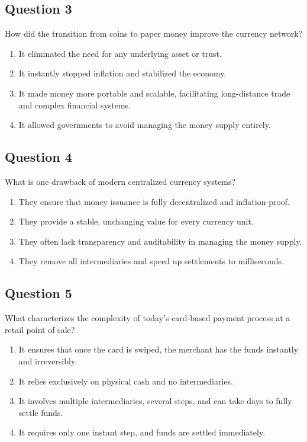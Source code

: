 \documentclass[12pt,a4paper]{article}
\begin{document}
\subsection*{Question 3}
How did the transition from coins to paper money improve the currency network?

\begin{enumerate}[label=\Alph*., leftmargin=*]
\item It eliminated the need for any underlying asset or trust.
\item It instantly stopped inflation and stabilized the economy.
\item It made money more portable and scalable, facilitating long-distance trade and complex financial systems.
\item It allowed governments to avoid managing the money supply entirely.
\end{enumerate}

\bigskip


\subsection*{Question 4}
What is one drawback of modern centralized currency systems?

\begin{enumerate}[label=\Alph*., leftmargin=*]
\item They ensure that money issuance is fully decentralized and inflation-proof.
\item They provide a stable, unchanging value for every currency unit.
\item They often lack transparency and auditability in managing the money supply.
\item They remove all intermediaries and speed up settlements to milliseconds.
\end{enumerate}

\bigskip


\subsection*{Question 5}
What characterizes the complexity of today’s card-based payment process at a retail point of sale?

\begin{enumerate}[label=\Alph*., leftmargin=*]
\item It ensures that once the card is swiped, the merchant has the funds instantly and irreversibly.
\item It relies exclusively on physical cash and no intermediaries.
\item It involves multiple intermediaries, several steps, and can take days to fully settle funds.
\item It requires only one instant step, and funds are settled immediately.
\end{enumerate}
\end{document}
